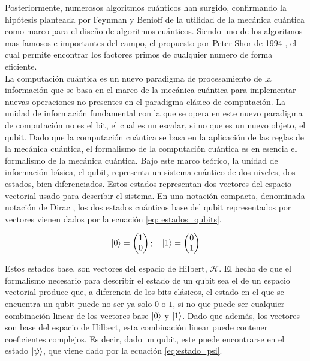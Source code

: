 Posteriormente, numerosos algoritmos cuánticos han surgido, confirmando la hipótesis planteada por Feynman y Benioff de la utilidad de la mecánica cuántica como marco para el diseño de algoritmos cuánticos. Siendo uno de los algoritmos mas famosos e importantes del campo, el propuesto por Peter Shor de 1994 \citep{shor}, el cual permite encontrar los factores primos de cualquier numero de forma eficiente. \\

La computación cuántica es un nuevo paradigma de procesamiento de la información que se basa en el marco de la mecánica cuántica para implementar nuevas operaciones no presentes en el paradigma clásico de computación. La unidad de información fundamental con la que se opera en este nuevo paradigma de computación no es el bit, el cual es un escalar, si no que es un nuevo objeto, el qubit. Dado que la computación cuántica se basa en la aplicación de las reglas de la mecánica cuántica, el formalismo de la computación cuántica es en esencia el formalismo de la mecánica cuántica. Bajo este marco teórico, la unidad de información básica, el qubit, representa un sistema cuántico de dos niveles, dos estados, bien diferenciados. Estos estados representan dos vectores del espacio vectorial usado para describir el sistema. En una notación compacta, denominada notación de Dirac \citep{dirac1939}, los dos estados cuánticos base del qubit representados por vectores vienen dados por la ecuación  \ref{eq: estados_qubits}.  


\begin{equation}
    \ket{0} = 
    \begin{pmatrix}
        1 \\
        0
    \end{pmatrix}
    ;
    \quad
    \ket{1} = 
    \begin{pmatrix}
        0 \\
        1
    \end{pmatrix}
    \label{eq: estados_qubits}
\end{equation}


Estos estados base, son vectores del espacio de Hilbert, $\mathcal{H}$. El hecho de que el formalismo necesario para describir el estado de un qubit sea el de un espacio vectorial produce que, a diferencia de los bits clásicos, el estado en el que se encuentra un qubit puede no ser ya solo $0$ o $1$, si no que puede ser cualquier combinación linear de los vectores base $\ket{0}$ y $\ket{1}$. Dado que además, los vectores son base del espacio de Hilbert, esta combinación linear puede contener coeficientes complejos. Es decir, dado un qubit, este puede encontrarse en el estado $\ket{\psi}$, que viene dado por la ecuación \ref{eq:estado_psi}.

